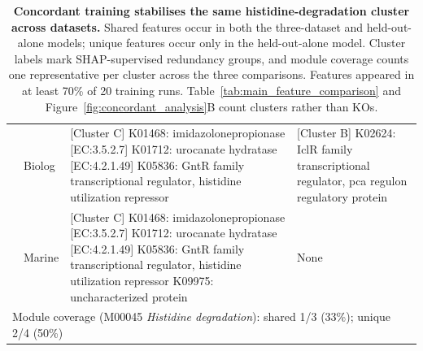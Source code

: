 \begin{table}[p]
\begin{tabularx}{\linewidth}{llXX}
 & Biolog & [Cluster C] K01468: imidazolonepropionase [EC:3.5.2.7] \newline [Cluster C] K01712: urocanate hydratase [EC:4.2.1.49] \newline K05836: GntR family transcriptional regulator, histidine utilization repressor & [Cluster B] K02624: IclR family transcriptional regulator, pca regulon regulatory protein \\
 & Marine & [Cluster C] K01468: imidazolonepropionase [EC:3.5.2.7] \newline [Cluster C] K01712: urocanate hydratase [EC:4.2.1.49] \newline K05836: GntR family transcriptional regulator, histidine utilization repressor \newline K09975: uncharacterized protein & None \\
\multicolumn{4}{l}{\footnotesize Module coverage (M00045 \textit{Histidine degradation}): shared 1/3 (33\%); unique 2/4 (50\%)} \\
\hline
\end{tabularx}
\caption{\textbf{Concordant training stabilises the same histidine-degradation cluster across datasets.} Shared features occur in both the three-dataset and held-out-alone models; unique features occur only in the held-out-alone model. Cluster labels mark SHAP-supervised redundancy groups, and module coverage counts one representative per cluster across the three comparisons. Features appeared in at least 70\% of 20 training runs. Table~\ref{tab:main_feature_comparison} and Figure~\ref{fig:concordant_analysis}B count clusters rather than KOs.}
\label{tab:feature_comparison}
\end{table}
